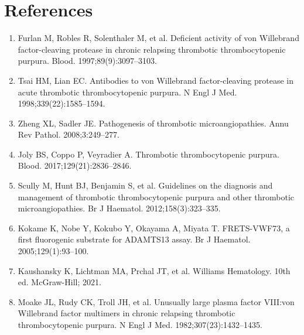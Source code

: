 \section*{References}
\begin{enumerate}
  \item Furlan M, Robles R, Solenthaler M, et al. Deficient activity of von Willebrand factor-cleaving protease in chronic relapsing thrombotic thrombocytopenic purpura. Blood. 1997;89(9):3097--3103.
  \item Tsai HM, Lian EC. Antibodies to von Willebrand factor-cleaving protease in acute thrombotic thrombocytopenic purpura. N Engl J Med. 1998;339(22):1585--1594.
  \item Zheng XL, Sadler JE. Pathogenesis of thrombotic microangiopathies. Annu Rev Pathol. 2008;3:249--277.
  \item Joly BS, Coppo P, Veyradier A. Thrombotic thrombocytopenic purpura. Blood. 2017;129(21):2836--2846.
  \item Scully M, Hunt BJ, Benjamin S, et al. Guidelines on the diagnosis and management of thrombotic thrombocytopenic purpura and other thrombotic microangiopathies. Br J Haematol. 2012;158(3):323--335.
  \item Kokame K, Nobe Y, Kokubo Y, Okayama A, Miyata T. FRETS-VWF73, a first fluorogenic substrate for ADAMTS13 assay. Br J Haematol. 2005;129(1):93--100.
  \item Kaushansky K, Lichtman MA, Prchal JT, et al. Williams Hematology. 10th ed. McGraw-Hill; 2021.
  \item Moake JL, Rudy CK, Troll JH, et al. Unusually large plasma factor VIII:von Willebrand factor multimers in chronic relapsing thrombotic thrombocytopenic purpura. N Engl J Med. 1982;307(23):1432--1435.
\end{enumerate}

\clearpage
